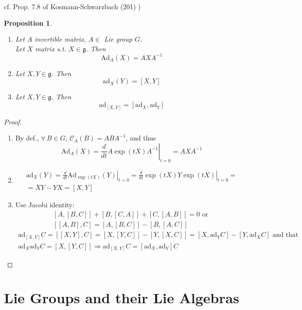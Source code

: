 \documentclass[10pt]{amsart}
\newtheorem{proposition}{Proposition}
\begin{document}
\begin{multicols*}{2}
cf. Prop. 7.8 of Kosmann-Schwarzbach (201) \cite{YKosmann-Schwarzbach2010})
\begin{proposition}
	\begin{enumerate}
		\item Let $A$ invertible matrix, $A \in $ Lie group $G$.  \\
		Let $X$ matrix s.t. $X \in \mathfrak{g}$.  Then
		\[
		\text{Ad}_A(X) = AXA^{-1}
		\]
		\item Let $X,Y \in \mathfrak{g}$.  Then 
		\[
		\text{ad}_X(Y) = [X,Y]
		\]
		\item Let $X,Y \in \mathfrak{g}$.  Then 
		\[
		\text{ad}_{[X,Y]} = [ \text{ad}_X, \text{ad}_Y ]
		\]
	\end{enumerate}
\end{proposition}
\begin{proof}
	\begin{enumerate}
		\item By def., $\forall \, B \in G$, $\mathcal{C}_A(B) = ABA^{-1}$, and thus
		\[
		\text{Ad}_A(X) = \left. \frac{d}{dt} A\exp{ (tX)  }A^{-1} \right|_{t=0} = AXA^{-1}
		\]
		\item \[
		\begin{gathered}
		\text{ad}_X(Y) = \left. \frac{d}{dt} \text{Ad}_{\exp{(tX)}}(Y) \right|_{t=0} = \left. \frac{d}{dt} \exp{(tX)} Y \exp{(tX)} \right|_{t=0} = \\
		= XY - YX = [X,Y] 
		\end{gathered}
		\]
		\item Use Jacobi identity: 
		\[
		\begin{gathered}
		[A,[B,C]] +  [B,[C,A]] +  [C,[A,B]] = 0 \text{ or } \\ 
		[[A,B],C] = [A,[B,C]] - [B,[A,C]]
		\end{gathered}
		\] 
		\[
		\begin{gathered}
		\text{ad}_{[X,Y]}C = [[X,Y],C] = [X,[Y,C]] - [Y,[X,C]] = [X,\text{ad}_YC] - [Y,\text{ad}_XC] \text{ and that } \\ 
		\text{ad}_X\text{ad}_Y C = [X,[Y,C]] \Longrightarrow \text{ad}_{[X,Y]}C = [\text{ad}_X,\text{ad}_Y ] C
		\end{gathered}
		\]
	\end{enumerate}
\end{proof}

\section{Lie Groups and their Lie Algebras}


\end{multicols*}
\end{document}

